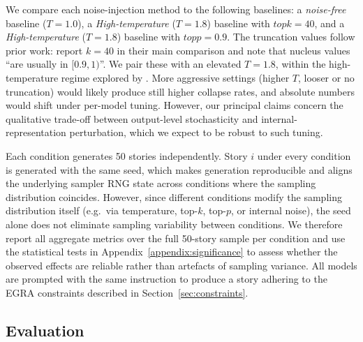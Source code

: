 \documentclass[11pt]{article}
\begin{document}
We compare each noise-injection method to the following baselines: a \textit{noise-free} baseline ($T=1.0$), a \textit{High-temperature} ($T=1.8$) baseline with $topk=40$, and a \textit{High-temperature} ($T=1.8$) baseline with $topp=0.9$. The truncation values follow prior work: \citet{holtzman2020curious} report $k=40$ in their main comparison and note that nucleus values ``are usually in $[0.9, 1)$''. We pair these with an elevated $T=1.8$, within the high-temperature regime explored by \citet{nguyen2025turningheatminpsampling}. More aggressive settings (higher $T$, looser or no truncation) would likely produce still higher collapse rates, and absolute numbers would shift under per-model tuning. However, our principal claims concern the qualitative trade-off between output-level stochasticity and internal-representation perturbation, which we expect to be robust to such tuning.
 
Each condition generates 50 stories independently. Story $i$ under every condition is generated with the same seed, which makes generation reproducible and aligns the underlying sampler RNG state across conditions where the sampling distribution coincides. However, since different conditions modify the sampling distribution itself (e.g.\ via temperature, top-$k$, top-$p$, or internal noise), the seed alone does not eliminate sampling variability between conditions. We therefore report all aggregate metrics over the full 50-story sample per condition and use the statistical tests in Appendix~\ref{appendix:significance} to assess whether the observed effects are reliable rather than artefacts of sampling variance. All models are prompted with the same instruction to produce a story adhering to the EGRA constraints described in Section~\ref{sec:constraints}.

\subsection{Evaluation}
\end{document}
